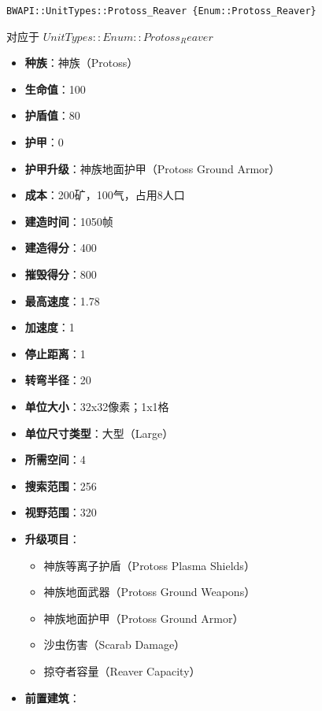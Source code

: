 \begin{tcolorbox}[colback=white, colframe=black!60!white, title=Protoss\_Reaver(), arc=0mm]
    \begin{verbatim}
BWAPI::UnitTypes::Protoss_Reaver {Enum::Protoss_Reaver}
    \end{verbatim}
    对应于  $ UnitTypes::Enum::Protoss_Reaver $ 
    \begin{itemize}
        \item \textbf{种族}：神族（Protoss）
        \item \textbf{生命值}：100
        \item \textbf{护盾值}：80
        \item \textbf{护甲}：0
        \item \textbf{护甲升级}：神族地面护甲（Protoss Ground Armor）
        \item \textbf{成本}：200矿，100气，占用8人口
        \item \textbf{建造时间}：1050帧
        \item \textbf{建造得分}：400
        \item \textbf{摧毁得分}：800
        \item \textbf{最高速度}：1.78
        \item \textbf{加速度}：1
        \item \textbf{停止距离}：1
        \item \textbf{转弯半径}：20
        \item \textbf{单位大小}：32x32像素；1x1格
        \item \textbf{单位尺寸类型}：大型（Large）
        \item \textbf{所需空间}：4
        \item \textbf{搜索范围}：256
        \item \textbf{视野范围}：320
        \item \textbf{升级项目}：
            \begin{itemize}
                \item 神族等离子护盾（Protoss Plasma Shields）
                \item 神族地面武器（Protoss Ground Weapons）
                \item 神族地面护甲（Protoss Ground Armor）
                \item 沙虫伤害（Scarab Damage）
                \item 掠夺者容量（Reaver Capacity）
            \end{itemize}
        \item \textbf{前置建筑}：

\end{itemize}
\end{tcolorbox}
